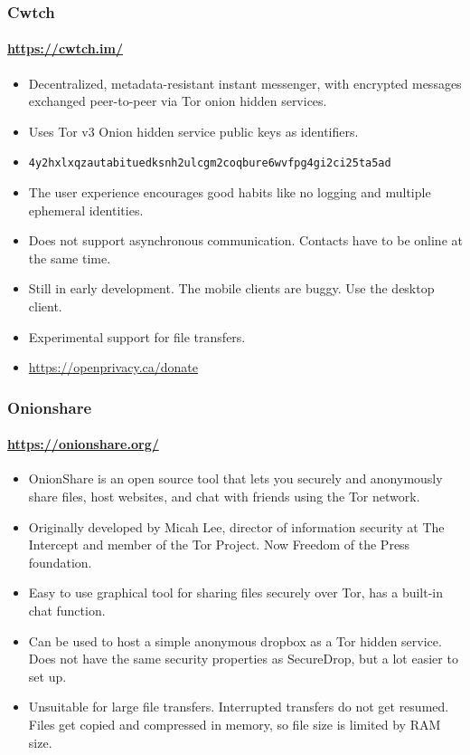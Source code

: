 \documentclass[aspectratio=169,usenames,dvipsnames]{beamer}
\begin{document}
\begin{frame}
  \frametitle{Cwtch}
  \framesubtitle{\url{https://cwtch.im/}}

  \begin{itemize}[<+->]
    \item Decentralized, metadata-resistant instant messenger, with encrypted
      messages exchanged peer-to-peer via Tor onion hidden services.
    \item Uses Tor v3 Onion hidden service public keys as identifiers.
    \item \texttt{4y2hxlxqzautabituedksnh2ulcgm2coqbure6wvfpg4gi2ci25ta5ad}
    \item The user experience encourages good habits like no logging and
      multiple ephemeral identities.
    \item Does not support asynchronous communication. Contacts have to be
      online at the same time.
    \item Still in early development. The mobile clients are buggy. Use the
      desktop client.
    \item Experimental support for file transfers.
    \item \url{https://openprivacy.ca/donate}
  \end{itemize}

\end{frame}

\begin{frame}
  \frametitle{Onionshare}
  \framesubtitle{\url{https://onionshare.org/}}

  \begin{itemize}[<+->]
    \item OnionShare is an open source tool that lets you securely and
      anonymously share files, host websites, and chat with friends using
      the Tor network.
    \item Originally developed by Micah Lee, director of information security
      at The Intercept and member of the Tor Project. Now Freedom of the Press
      foundation.
    \item Easy to use graphical tool for sharing files securely over Tor,
      has a built-in chat function.
    \item Can be used to host a simple anonymous dropbox as a Tor hidden
      service. Does not have the same security properties as SecureDrop, but a
      lot easier to set up.
    \item Unsuitable for large file transfers. Interrupted transfers do not
      get resumed. Files get copied and compressed in memory, so file size
      is limited by RAM size.
  \end{itemize}

\end{frame}
\end{document}
